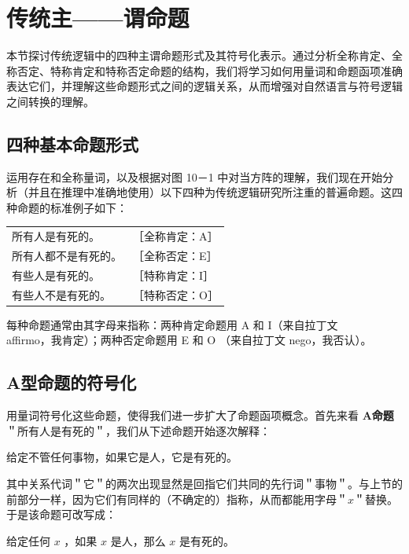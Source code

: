 \section{传统主——谓命题}

\begin{logicbox}[title=引言]
本节探讨传统逻辑中的四种主谓命题形式及其符号化表示。通过分析全称肯定、全称否定、特称肯定和特称否定命题的结构，我们将学习如何用量词和命题函项准确表达它们，并理解这些命题形式之间的逻辑关系，从而增强对自然语言与符号逻辑之间转换的理解。
\end{logicbox}

\subsection{四种基本命题形式}

运用存在和全称量词，以及根据对图 10－1 中对当方阵的理解，我们现在开始分析（并且在推理中准确地使用）以下四种为传统逻辑研究所注重的普遍命题。这四种命题的标准例子如下：

\begin{center}
\begin{tabular}{ll}
所有人是有死的。 & ［全称肯定：A］ \\
所有人都不是有死的。 & ［全称否定：E］ \\
有些人是有死的。 & ［特称肯定：I］ \\
有些人不是有死的。 & ［特称否定：O］ \\
\end{tabular}
\end{center}

每种命题通常由其字母来指称：两种肯定命题用 A 和 I（来自拉丁文\\
affirmo，我肯定）；两种否定命题用 E 和 O （来自拉丁文 nego，我否认）。\cite{peirce1883}

\subsection{A型命题的符号化}

用量词符号化这些命题，使得我们进一步扩大了命题函项概念。首先来看 \textbf{A命题}＂所有人是有死的＂，我们从下述命题开始逐次解释：

给定不管任何事物，如果它是人，它是有死的。

其中关系代词＂它＂的两次出现显然是回指它们共同的先行词＂事物＂。与上节的前部分一样，因为它们有同样的（不确定的）指称，从而都能用字母＂$x$＂替换。于是该命题可改写成：

给定任何 $x$ ，如果 $x$ 是人，那么 $x$ 是有死的。

